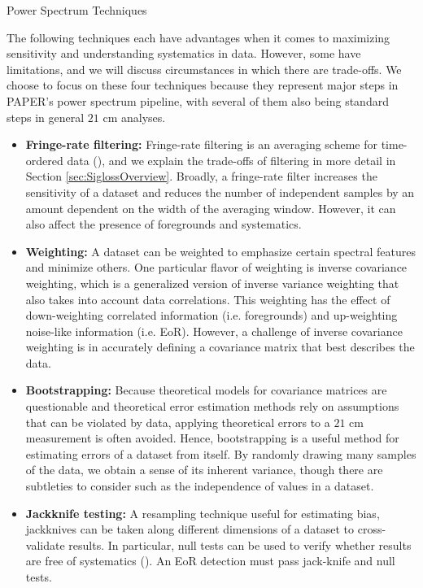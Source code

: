 \documentclass[preprint2,numberedappendix,tighten]{aastex6}  %
\begin{document}
\begin{center}
Power Spectrum Techniques
\end{center}

The following techniques each have advantages when it comes to maximizing sensitivity and understanding systematics in data. However, some have limitations, and we will discuss circumstances in which there are trade-offs. We choose to focus on these four techniques because they represent major steps in PAPER's power spectrum pipeline, with several of them also being standard steps in general $21$ cm analyses.
\begin{itemize}
\item \textbf{Fringe-rate filtering:} Fringe-rate filtering is an averaging scheme for time-ordered data (\citealt{parsons_et_al2016}), and we explain the trade-offs of filtering in more detail in Section \ref{sec:SiglossOverview}. Broadly, a fringe-rate filter increases the sensitivity of a dataset and reduces the number of independent samples by an amount dependent on the width of the averaging window. However, it can also affect the presence of foregrounds and systematics. 
\item \textbf{Weighting:} A dataset can be weighted to emphasize certain spectral features and minimize others. One particular flavor of weighting is inverse covariance weighting, which is a generalized version of inverse variance weighting that also takes into account data correlations. This weighting has the effect of down-weighting correlated information (i.e. foregrounds) and up-weighting noise-like information (i.e. EoR). However, a challenge of inverse covariance weighting is in accurately defining a covariance matrix that best describes the data. 
\item \textbf{Bootstrapping:} Because theoretical models for covariance matrices are questionable and theoretical error estimation methods rely on assumptions that can be violated by data, applying theoretical errors to a $21$ cm measurement is often avoided. Hence, bootstrapping is a useful method for estimating errors of a dataset from itself. By randomly drawing many samples of the data, we obtain a sense of its inherent variance, though there are subtleties to consider such as the independence of values in a dataset.
\item \textbf{Jackknife testing:} A resampling technique useful for estimating bias, jackknives can be taken along different dimensions of a dataset to cross-validate results. In particular, null tests can be used to verify whether results are free of systematics (\citealt{keating_et_al2016}). An EoR detection must pass jack-knife and null tests.
\end{itemize}
\end{document}
